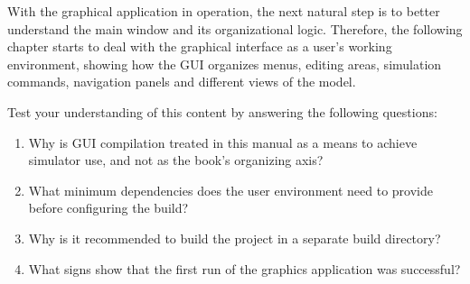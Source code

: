 With the graphical application in operation, the next natural step is to better understand the main window and its organizational logic. Therefore, the following chapter starts to deal with the graphical interface as a user's working environment, showing how the GUI organizes menus, editing areas, simulation commands, navigation panels and different views of the model.

Test your understanding of this content by answering the following questions:

\begin{enumerate}
\item Why is GUI compilation treated in this manual as a means to achieve simulator use, and not as the book's organizing axis?

\item What minimum dependencies does the user environment need to provide before configuring the build?

\item Why is it recommended to build the project in a separate build directory?

\item What signs show that the first run of the graphics application was successful?
\end{enumerate}
